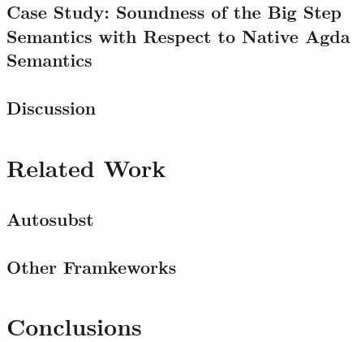 \documentclass[screen,nonacm]{acmart}
\begin{document}
\subsection{Case Study: Soundness of the Big Step Semantics with Respect to Native Agda Semantics}\label{sec:soundness}

\subsection{Discussion}\label{sec:discussion-3}

\section{Related Work}\label{sec:related-work}

\subsection{Autosubst}\label{sec:autosubst}

\citet{10.1145/3293880.3294101}

\subsection{Other Framkeworks}\label{sec:related-frameworks}

\section{Conclusions}\label{sec:conclusions}



\end{document}
